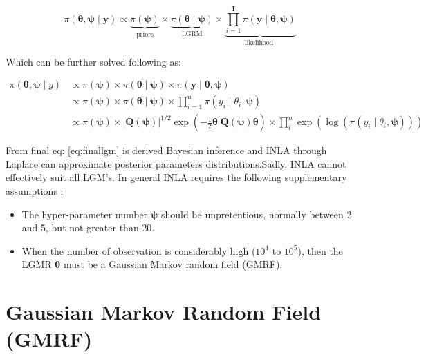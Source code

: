 \documentclass[
  12pt,
  a4paper,
  oneside]{book}
\providecommand{\tightlist}{%
  \setlength{\itemsep}{0pt}\setlength{\parskip}{0pt}}
\theoremstyle{definition}
\theoremstyle{definition}
\theoremstyle{definition}
\theoremstyle{remark}
\begin{document}
\begin{equation}
\pi(\boldsymbol{\theta}, \boldsymbol{\psi} \mid \mathbf{y})\propto  \underbrace{\pi(\boldsymbol{\psi})}_{\text {priors}} \times \underbrace{\pi(\boldsymbol\theta \mid \boldsymbol\psi)}_{\text {LGRM}} \times \underbrace{\prod_{i=1}^{\mathbf{I}} \pi\left(\mathbf{y} \mid \boldsymbol\theta, \boldsymbol{\psi}\right)}_{\text {likelihood }}
\label{eq:formallgm}
\end{equation}

Which can be further solved following \citep{Blangiardo-Cameletti} as:

\begin{equation}
\begin{aligned}
\pi(\boldsymbol{\theta}, \boldsymbol{\psi} \mid y) & \propto \pi(\boldsymbol{\psi}) \times \pi(\boldsymbol{\theta} \mid \boldsymbol{\psi}) \times \pi(\mathbf{y} \mid \boldsymbol{\theta}, \boldsymbol{\psi}) \\
& \propto \pi(\boldsymbol{\psi}) \times \pi(\boldsymbol{\theta} \mid \boldsymbol{\psi}) \times \prod_{i=1}^{n} \pi\left(y_{i} \mid \theta_{i}, \boldsymbol{\psi}\right) \\
& \propto \pi(\boldsymbol{\psi}) \times|\boldsymbol{Q}(\boldsymbol{\psi})|^{1 / 2} \exp \left(-\frac{1}{2} \boldsymbol{\theta}^{\prime} \boldsymbol{Q}(\boldsymbol{\psi}) \boldsymbol{\theta}\right) \times \prod_{i}^{n} \exp \left(\log \left(\pi\left(y_{i} \mid \theta_{i}, \boldsymbol{\psi}\right)\right)\right)
\end{aligned}
\label{eq:finallgm}
\end{equation}

From final eq: \eqref{eq:finallgm} is derived Bayesian inference and INLA through Laplace can approximate posterior parameters distributions.Sadly, INLA cannot effectively suit all LGM's. In general INLA requires the following supplementary assumptions \citeyearpar{wang2018bayesian}:

\begin{itemize}
\tightlist
\item
  The hyper-parameter number \(\boldsymbol\psi\) should be unpretentious, normally between 2 and 5, but not greater than 20.
\item
  When the number of observation is considerably high (\(10^4\) to \(10^5\)), then the LGMR \(\boldsymbol\theta\) must be a Gaussian Markov random field (GMRF).
\end{itemize}

\hypertarget{gmrf}{%
\section{Gaussian Markov Random Field (GMRF)}\label{gmrf}}
\end{document}
